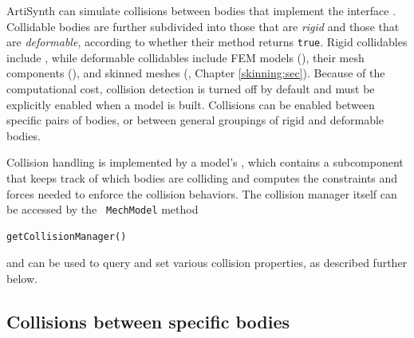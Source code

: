 ArtiSynth can simulate collisions between bodies that implement the
interface .
Collidable bodies are further subdivided into those that are {\it
rigid} and those that are {\it deformable}, according to whether their
method returns {\tt true}. Rigid collidables include
, while deformable
collidables include FEM models 
(),
their mesh components
(),
and skinned meshes 
(,
Chapter \ref{skinning:sec}).
Because of the computational cost,
collision detection is turned off by default and must be explicitly
enabled when a model is built.  Collisions can be enabled between
specific pairs of bodies, or between general groupings of rigid and
deformable bodies.

Collision handling is implemented by a model's
, which
contains a 
subcomponent that keeps track of which bodies are colliding and
computes the constraints and forces needed to enforce the collision
behaviors. The collision manager itself can be accessed by the {\tt
MechModel} method
%
\begin{lstlisting}[]
  getCollisionManager()
\end{lstlisting}
%
and can be used to query and set various collision properties, as
described further below.

\subsection{Collisions between specific bodies}
\label{specificCollisions:sec}


